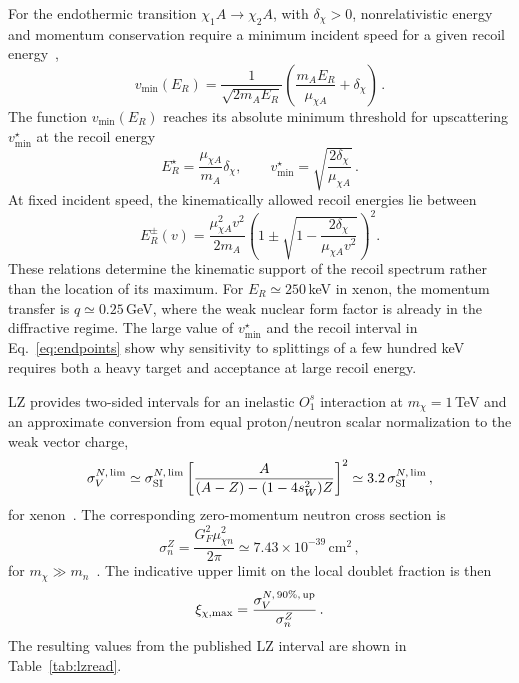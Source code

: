 \documentclass[aps,prd,reprint,preprintnumbers,superscriptaddress,nofootinbib,floatfix]{revtex4-2}
\newcommand{\dchi}{\delta_\chi}
\begin{document}
For the endothermic transition $\chi_1 A\to\chi_2 A$, with $\dchi>0$, nonrelativistic energy and momentum conservation require a minimum incident speed for a given recoil energy~\cite{Tucker-Smith:2001myb,Tucker-Smith:2004mxa},
\begin{equation}
    v_{\min}(E_R)=\frac{1}{\sqrt{2m_AE_R}} \left(\frac{m_AE_R}{\mu_{\chi A}}+\dchi\right)\,.
    \label{eq:vmin}
\end{equation}
The function $v_{\min}(E_R)$ reaches its absolute minimum threshold for upscattering $v_{\min}^\star$ at the recoil energy
\begin{equation}
    E_R^\star=\frac{\mu_{\chi A}}{m_A}\dchi,\qquad v_{\min}^\star=\sqrt{\frac{2\dchi}{\mu_{\chi A}}}\,.
    \label{eq:estar}
\end{equation}
At fixed incident speed, the kinematically allowed recoil energies lie between
\begin{equation}
    E_R^\pm(v)=\frac{\mu_{\chi A}^2v^2}{2m_A} \left(1\pm\sqrt{1-\frac{2\dchi}{\mu_{\chi A}v^2}}\right)^2.
    \label{eq:endpoints}
\end{equation}
These relations determine the kinematic support of the recoil spectrum rather than the location of its maximum. For $E_R\simeq250$\,keV in xenon, the momentum transfer is $q\simeq0.25$\,GeV, where the weak nuclear form factor is already in the diffractive regime. The large value of $v_{\min}^\star$ and the recoil interval in Eq.~\eqref{eq:endpoints} show why sensitivity to splittings of a few hundred keV requires both a heavy target and acceptance at large recoil energy.

LZ provides two-sided intervals for an inelastic $O_1^s$ interaction at $m_\chi=1$\,TeV and an approximate conversion from equal proton/neutron scalar normalization to the weak vector charge,
\begin{equation}
    \sigma_V^{N,\,\rm lim}\simeq\sigma_{\rm SI}^{N,\,\rm lim} \left[\frac{A}{(A-Z)-(1-4s_W^2)Z}\right]^2 \simeq3.2\,\sigma_{\rm SI}^{N,\,\rm lim}\,,
    \label{eq:lzconversion}
\end{equation}
for xenon~\cite{LZ:2026axp}. The corresponding zero-momentum neutron cross section is
\begin{equation}
    \sigma_n^Z=\frac{G_F^2\mu_{\chi n}^2}{2\pi} \simeq 7.43\times10^{-39}\,\mathrm{cm^2}\,,
    \label{eq:sigman}
\end{equation}
for $m_\chi\gg m_n$~\cite{Pospelov:2026ewn}. The indicative upper limit on the local doublet fraction is then
\begin{equation}
    \xi_{\chi,\max} = \frac{\sigma_V^{N,\,90\%,\,\rm up}}{\sigma_n^Z}\,.
\end{equation}
The resulting values from the published LZ interval are shown in Table~\ref{tab:lzread}.
\end{document}
